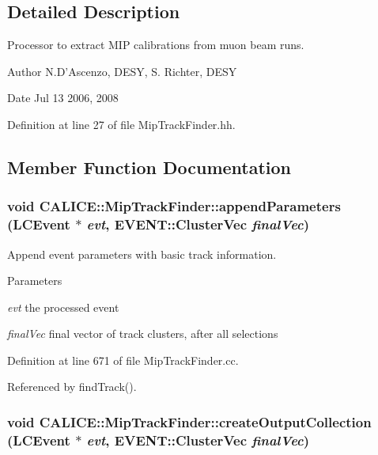 \subsection{Detailed Description}
Processor to extract MIP calibrations from muon beam runs. \begin{DoxyAuthor}{Author}
N.D'Ascenzo, DESY, S. Richter, DESY 
\end{DoxyAuthor}
\begin{DoxyDate}{Date}
Jul 13 2006, 2008 
\end{DoxyDate}


Definition at line 27 of file MipTrackFinder.hh.

\subsection{Member Function Documentation}
\subsubsection[{appendParameters}]{\setlength{\rightskip}{0pt plus 5cm}void CALICE::MipTrackFinder::appendParameters (LCEvent $\ast$ {\em evt}, \/  EVENT::ClusterVec {\em finalVec})\hspace{0.3cm}{\ttfamily  [private]}}\label{classCALICE_1_1MipTrackFinder_afed445ffc703d8aab42b72f8caea22f5}


Append event parameters with basic track information. 
\begin{DoxyParams}{Parameters}
\item[{\em evt}]the processed event \item[{\em finalVec}]final vector of track clusters, after all selections \end{DoxyParams}


Definition at line 671 of file MipTrackFinder.cc.

Referenced by findTrack().
\subsubsection[{createOutputCollection}]{\setlength{\rightskip}{0pt plus 5cm}void CALICE::MipTrackFinder::createOutputCollection (LCEvent $\ast$ {\em evt}, \/  EVENT::ClusterVec {\em finalVec})\hspace{0.3cm}{\ttfamily  [private]}}\label{classCALICE_1_1MipTrackFinder_a9c4c925f38c5746f61e0b0709f05c03a}


